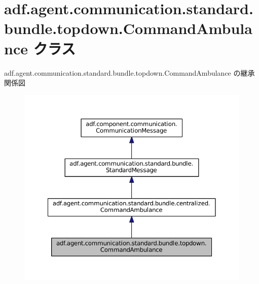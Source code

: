 \hypertarget{classadf_1_1agent_1_1communication_1_1standard_1_1bundle_1_1topdown_1_1CommandAmbulance}{}\section{adf.\+agent.\+communication.\+standard.\+bundle.\+topdown.\+Command\+Ambulance クラス}
\label{classadf_1_1agent_1_1communication_1_1standard_1_1bundle_1_1topdown_1_1CommandAmbulance}


adf.\+agent.\+communication.\+standard.\+bundle.\+topdown.\+Command\+Ambulance の継承関係図
\nopagebreak
\begin{figure}[H]
\begin{center}
\leavevmode
\includegraphics[width=350pt]{classadf_1_1agent_1_1communication_1_1standard_1_1bundle_1_1topdown_1_1CommandAmbulance__inherit__graph}
\end{center}
\end{figure}


